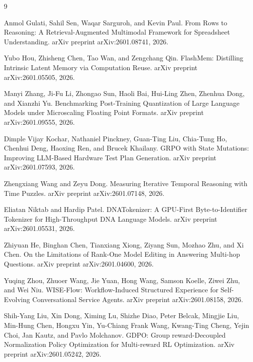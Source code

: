 \documentclass{article}
\begin{document}
\begin{thebibliography}{9}

Anmol Gulati, Sahil Sen, Waqar Sarguroh, and Kevin Paul. From Rows to Reasoning: A Retrieval-Augmented Multimodal Framework for Spreadsheet Understanding. arXiv preprint arXiv:2601.08741, 2026.

Yubo Hou, Zhisheng Chen, Tao Wan, and Zengchang Qin. FlashMem: Distilling Intrinsic Latent Memory via Computation Reuse. arXiv preprint arXiv:2601.05505, 2026.

Manyi Zhang, Ji-Fu Li, Zhongao Sun, Haoli Bai, Hui-Ling Zhen, Zhenhua Dong, and Xianzhi Yu. Benchmarking Post-Training Quantization of Large Language Models under Microscaling Floating Point Formats. arXiv preprint arXiv:2601.09555, 2026.

Dimple Vijay Kochar, Nathaniel Pinckney, Guan-Ting Liu, Chia-Tung Ho, Chenhui Deng, Haoxing Ren, and Brucek Khailany. GRPO with State Mutations: Improving LLM-Based Hardware Test Plan Generation. arXiv preprint arXiv:2601.07593, 2026.

Zhengxiang Wang and Zeyu Dong. Measuring Iterative Temporal Reasoning with Time Puzzles. arXiv preprint arXiv:2601.07148, 2026.

Eliatan Niktab and Hardip Patel. DNATokenizer: A GPU-First Byte-to-Identifier Tokenizer for High-Throughput DNA Language Models. arXiv preprint arXiv:2601.05531, 2026.

Zhiyuan He, Binghan Chen, Tianxiang Xiong, Ziyang Sun, Mozhao Zhu, and Xi Chen. On the Limitations of Rank-One Model Editing in Answering Multi-hop Questions. arXiv preprint arXiv:2601.04600, 2026.

Yuqing Zhou, Zhuoer Wang, Jie Yuan, Hong Wang, Samson Koelle, Ziwei Zhu, and Wei Niu. WISE-Flow: Workflow-Induced Structured Experience for Self-Evolving Conversational Service Agents. arXiv preprint arXiv:2601.08158, 2026.

Shih-Yang Liu, Xin Dong, Ximing Lu, Shizhe Diao, Peter Belcak, Mingjie Liu, Min-Hung Chen, Hongxu Yin, Yu-Chiang Frank Wang, Kwang-Ting Cheng, Yejin Choi, Jan Kautz, and Pavlo Molchanov. GDPO: Group reward-Decoupled Normalization Policy Optimization for Multi-reward RL Optimization. arXiv preprint arXiv:2601.05242, 2026.


\end{thebibliography}
\end{document}
